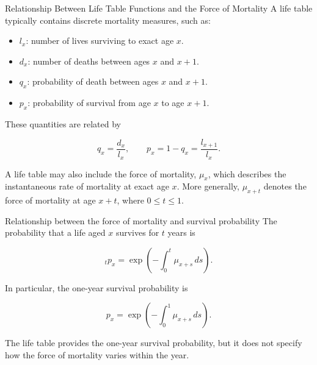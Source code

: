 \documentclass[
  ignorenonframetext,
  aspectratio=169,
]{beamer}
\providecommand{\tightlist}{%
  \setlength{\itemsep}{0pt}\setlength{\parskip}{0pt}}
\begin{document}
\begin{frame}{Relationship Between Life Table Functions and the Force of
Mortality}
\protect{}\label{relationship-between-life-table-functions-and-the-force-of-mortality}
A life table typically contains discrete mortality measures, such as:

\begin{itemize}
\tightlist
\item
  \(l_x\): number of lives surviving to exact age \(x\).
\item
  \(d_x\): number of deaths between ages \(x\) and \(x+1\).
\item
  \(q_x\): probability of death between ages \(x\) and \(x+1\).
\item
  \(p_x\): probability of survival from age \(x\) to age \(x+1\).
\end{itemize}

These quantities are related by

\[
q_x=\frac{d_x}{l_x},
\qquad
p_x=1-q_x=\frac{l_{x+1}}{l_x}.
\]

A life table may also include the force of mortality, \(\mu_x\), which
describes the instantaneous rate of mortality at exact age \(x\). More
generally, \(\mu_{x+t}\) denotes the force of mortality at age \(x+t\),
where \(0\leq t\leq 1\).
\end{frame}

\begin{frame}{Relationship between the force of mortality and survival
probability}
\protect{}\label{relationship-between-the-force-of-mortality-and-survival-probability}
The probability that a life aged \(x\) survives for \(t\) years is

\[
{}_tp_x
=
\exp\left(-\int_0^t\mu_{x+s}\,ds\right).
\]

In particular, the one-year survival probability is

\[
p_x
=
\exp\left(-\int_0^1\mu_{x+s}\,ds\right).
\]

The life table provides the one-year survival probability, but it does
not specify how the force of mortality varies within the year.
\end{frame}
\end{document}
